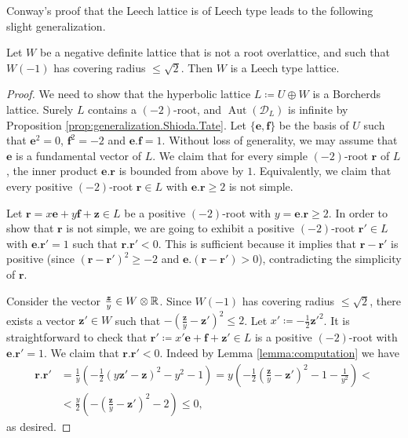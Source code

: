 \documentclass[11pt,letterpaper]{amsart}
\newcommand{\vect}[1]{\boldsymbol{#1}}
\DeclareMathOperator{\Aut}{Aut}
\begin{document}
Conway's \cite[Chapter 27, Theorem 1]{conway.sloane.lattices} proof that the Leech lattice is of Leech type leads to the following slight generalization.
\begin{proposition} \label{prop:covering.radius}
Let $W$ be a negative definite lattice that is not a root overlattice, and such that $W(-1)$ has covering radius $\le \sqrt{2}$. Then $W$ is a Leech type lattice.
\end{proposition}
\begin{proof}
We need to show that the hyperbolic lattice $L\coloneqq U\oplus W$ is a Borcherds lattice. Surely $L$ contains a $(-2)$-root, and $\Aut(\mathcal{D}_L)$ is infinite by Proposition \ref{prop:generalization.Shioda.Tate}. Let $\{\vect{e},\vect{f}\}$ be the basis of $U$ such that $\vect{e}^2=0$, $\vect{f}^2=-2$ and $\vect{e}.\vect{f}=1$. Without loss of generality, we may assume that $\vect{e}$ is a fundamental vector of $L$. We claim that for every simple $(-2)$-root $\vect{r}$ of $L$, the inner product $\vect{e}.\vect{r}$ is bounded from above by $1$. Equivalently, we claim that every positive $(-2)$-root $\vect{r}\in L$ with $\vect{e}.\vect{r} \ge 2$ is not simple.

Let $\vect{r}=x \vect{e} + y \vect{f} + \vect{z} \in L$ be a positive $(-2)$-root with $y=\vect{e}.\vect{r}\ge 2$. In order to show that $\vect{r}$ is not simple, we are going to exhibit a positive $(-2)$-root $\vect{r'}\in L$ with $\vect{e}.\vect{r'}=1$ such that $\vect{r}.\vect{r'} < 0$. This is sufficient because it implies that $\vect{r}-\vect{r'}$ is positive (since $(\vect{r}-\vect{r'})^2 \ge -2$ and $\vect{e}.(\vect{r}-\vect{r'})>0$), contradicting the simplicity of $\vect{r}$. 

Consider the vector $\frac{\vect{z}}{y}\in W\otimes \RR$. Since $W(-1)$ has covering radius $\le \sqrt{2}$, there exists a vector $\vect{z'}\in W$ such that $-\left(\frac{\vect{z}}{y}-\vect{z'}\right)^2 \le 2$. Let $x'\coloneqq -\frac{1}{2}\vect{z'}^2$. It is straightforward to check that $\vect{r'}\coloneqq x' \vect{e} + \vect{f} + \vect{z'}\in L$ is a positive $(-2)$-root with $\vect{e}.\vect{r'}=1$. We claim that $\vect{r}.\vect{r'}<0$. Indeed by Lemma \ref{lemma:computation} we have
\begin{equation*}
\begin{split}
    \vect{r}.\vect{r'} &=\frac{1}{y}\left( -\frac{1}{2}(y\vect{z'}-\vect{z})^2-y^2-1\right) 
    =y \left( -\frac{1}{2} \left(\frac{\vect{z}}{y}-\vect{z'}\right)^2-1-\frac{1}{y^2} \right) <\\
    &<\frac{y}{2} \left( - \left(\frac{\vect{z}}{y}-\vect{z'}\right)^2-2\right) \le 0,
\end{split}
\end{equation*}
as desired.
\end{proof}
\end{document}
